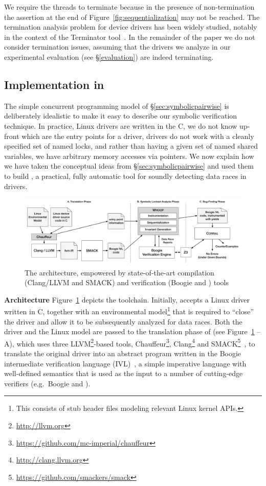 We require the threads to terminate because in the presence of non-termination the assertion at the end of Figure~\ref{fig:sequentialization} may not be reached.  The termination analysis problem for device drivers has been widely studied, notably in the context of the Terminator tool~\cite{cook2006termination}. In the remainder of the paper we do not consider termination issues, assuming that the drivers we analyze in our experimental evaluation (see \S\ref{evaluation}) are indeed terminating.

\subsection{Implementation in \whoop}
\label{sec:implementation}

The simple concurrent programming model of \S\ref{sec:symbolicpairwise} is deliberately idealistic to make it easy to describe our symbolic verification technique. In practice, Linux drivers are written in the C, we do not know up-front which are the entry points for a driver, drivers do not work with a cleanly specified set of named locks, and rather than having a given set of named shared variables, we have arbitrary memory accesses via pointers. We now explain how we have taken the conceptual ideas from \S\ref{sec:symbolicpairwise} and used them to build \whoop, a practical, fully automatic tool for soundly detecting data races in drivers.

\begin{figure}
\centering
\includegraphics[width=.99\linewidth]{img/whoop.pdf}
\caption{The \whoop architecture, empowered by state-of-the-art compilation (Clang/LLVM and SMACK) and verification (Boogie and \corral) tools}
\label{fig:whoop}
\end{figure}

\medskip\noindent\textbf{Architecture }
%
Figure~\ref{fig:whoop} depicts the \whoop toolchain. Initially, \whoop accepts a Linux driver written in C, together with an environmental model\footnote{This consists of stub header files modeling relevant Linux kernel APIs.} that is required to ``close'' the driver and allow it to be subsequently analyzed for data races. Both the driver and the Linux model are passed to the translation phase of \whoop (see Figure~\ref{fig:whoop} -- A), which uses three LLVM\footnote{\url{http://llvm.org}}-based tools, Chauffeur\footnote{\url{https://github.com/mc-imperial/chauffeur}}, Clang\footnote{\url{http://clang.llvm.org}} and SMACK\footnote{\url{https://github.com/smackers/smack}}~\cite{rakamaric2014smack}, to translate the original driver into an abstract program written in the Boogie intermediate verification language (IVL)~\cite{deline2005boogiepl}, a simple imperative language with well-defined semantics that is used as the input to a number of cutting-edge verifiers (e.g.\ Boogie and \corral).

